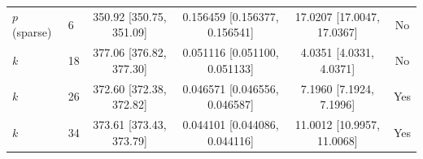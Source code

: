 \begin{table}[t]
\begin{tabular}{llcccc}
$p$ (sparse) & 6 & 350.92 [350.75, 351.09] & 0.156459 [0.156377, 0.156541] & 17.0207 [17.0047, 17.0367] & No \\
\addlinespace[2pt]
$k$ & 18 & 377.06 [376.82, 377.30] & 0.051116 [0.051100, 0.051133] & 4.0351 [4.0331, 4.0371] & No \\
$k$ & 26 & 372.60 [372.38, 372.82] & 0.046571 [0.046556, 0.046587] & 7.1960 [7.1924, 7.1996] & Yes \\
$k$ & 34 & 373.61 [373.43, 373.79] & 0.044101 [0.044086, 0.044116] & 11.0012 [10.9957, 11.0068] & Yes \\
\bottomrule
\end{tabular}
\end{table}
